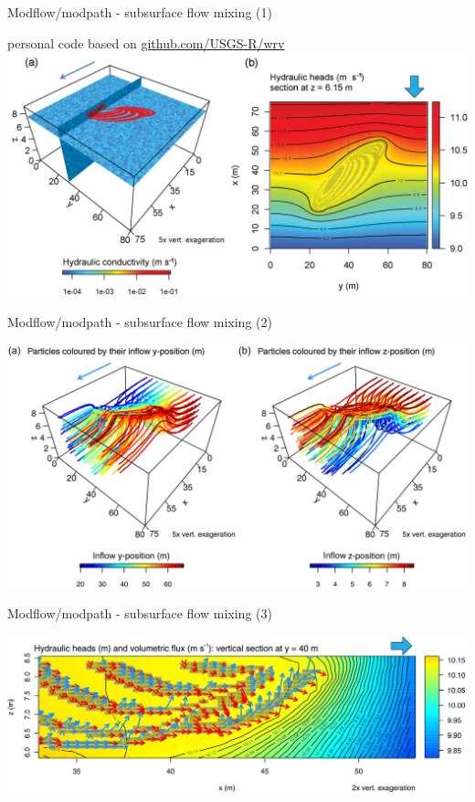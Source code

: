 \documentclass[8pt,ignorenonframetext,]{beamer}
\begin{document}
\begin{frame}{Modflow/modpath - subsurface flow mixing (1)}

personal code based on
\href{https://github.com/USGS-R/wrv}{github.com/USGS-R/wrv}
\includegraphics{imgPres/RMODFLOW_head.png}

\end{frame}

\begin{frame}{Modflow/modpath - subsurface flow mixing (2)}

\includegraphics{imgPres/RMODFLOW_particles.png}

\end{frame}

\begin{frame}{Modflow/modpath - subsurface flow mixing (3)}

\includegraphics{imgPres/RMODFLOW_zoom.png}

\end{frame}
\end{document}
